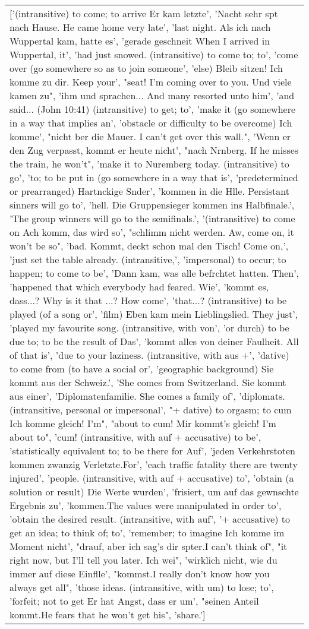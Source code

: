 \documentclass[a4paper,backgrid,frontgrid]{flacards}
\begin{document}
{\begin{tabular}{l}
\parbox[t][][t]{8cm}{\normalfont \small ['(intransitive) to come; to arrive Er kam letzte', 'Nacht sehr spt nach Hause.  He came home very late', 'last night. Als ich nach Wuppertal kam, hatte es', 'gerade geschneit  When I arrived in Wuppertal, it', 'had just snowed. (intransitive) to come to; to', 'come over (go somewhere so as to join someone', 'else) Bleib sitzen! Ich komme zu dir.  Keep your', "seat! I'm coming over to you. Und viele kamen zu", 'ihm und sprachen...  And many resorted unto him', 'and said... (John 10:41) (intransitive) to get; to', 'make it (go somewhere in a way that implies an', 'obstacle or difficulty to be overcome) Ich komme', "nicht ber die Mauer.  I can't get over this wall.", 'Wenn er den Zug verpasst, kommt er heute nicht', "nach Nrnberg.  If he misses the train, he won't", 'make it to Nuremberg today. (intransitive) to go', 'to; to be put in (go somewhere in a way that is', 'predetermined or prearranged) Hartnckige Snder', 'kommen in die Hlle.  Persistant sinners will go to', 'hell. Die Gruppensieger kommen ins Halbfinale.', 'The group winners will go to the semifinals.', '(intransitive) to come on Ach komm, das wird so', "schlimm nicht werden.  Aw, come on, it won't be so", 'bad. Kommt, deckt schon mal den Tisch!  Come on,', 'just set the table already. (intransitive,', 'impersonal) to occur; to happen; to come to be', 'Dann kam, was alle befrchtet hatten.  Then', 'happened that which everybody had feared. Wie', 'kommt es, dass...?  Why is it that ...? How come', 'that...? (intransitive) to be played (of a song or', 'film) Eben kam mein Lieblingslied.  They just', 'played my favourite song. (intransitive, with von', 'or durch) to be due to; to be the result of Das', 'kommt alles von deiner Faulheit.  All of that is', 'due to your laziness. (intransitive, with aus +', 'dative) to come from (to have a social or', 'geographic background) Sie kommt aus der Schweiz.', 'She comes from Switzerland. Sie kommt aus einer', 'Diplomatenfamilie.  She comes a family of', 'diplomats. (intransitive, personal or impersonal', "+ dative) to orgasm; to cum Ich komme gleich!  I'm", "about to cum! Mir kommt's gleich!  I'm about to", 'cum! (intransitive, with auf + accusative) to be', 'statistically equivalent to; to be there for Auf', 'jeden Verkehrstoten kommen zwanzig Verletzte.For', 'each traffic fatality there are twenty injured', 'people. (intransitive, with auf + accusative) to', 'obtain (a solution or result) Die Werte wurden', 'frisiert, um auf das gewnschte Ergebnis zu', 'kommen.The values were manipulated in order to', 'obtain the desired result. (intransitive, with auf', '+ accusative) to get an idea; to think of; to', 'remember; to imagine Ich komme im Moment nicht', "drauf, aber ich sag's dir spter.I can't think of", "it right now, but I'll tell you later. Ich wei", 'wirklich nicht, wie du immer auf diese Einflle', "kommst.I really don't know how you always get all", 'those ideas. (intransitive, with um) to lose; to', 'forfeit; not to get Er hat Angst, dass er um', "seinen Anteil kommt.He fears that he won't get his", 'share.'] }\\
\end{tabular}
}
\end{document}
